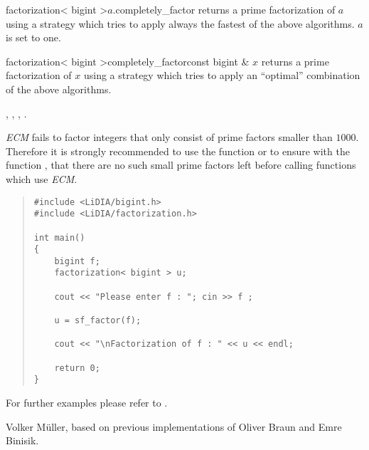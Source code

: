 \begin{cfcode}{factorization< bigint >}{$a$.completely_factor}{}
  returns a prime factorization of $a$ using a strategy which tries to apply always the fastest
  of the above algorithms.  $a$ is set to one.
\end{cfcode}

\begin{fcode}{factorization< bigint >}{completely_factor}{const bigint & $x$}
  returns a prime factorization of $x$ using a strategy which tries to apply an ``optimal''
  combination of the above algorithms.
\end{fcode}



\SEEALSO

, ,
,
.



\WARNINGS

\emph{ECM} fails to factor integers that only consist of prime factors smaller than $1000$.
Therefore it is strongly recommended to use the function  or to ensure with the
function , that there are no such small prime factors left before calling
functions which use \emph{ECM}.



\EXAMPLES

\begin{quote}
\begin{verbatim}
#include <LiDIA/bigint.h>
#include <LiDIA/factorization.h>

int main()
{
    bigint f;
    factorization< bigint > u;

    cout << "Please enter f : "; cin >> f ;

    u = sf_factor(f);

    cout << "\nFactorization of f : " << u << endl;

    return 0;
}
\end{verbatim}
\end{quote}

For further examples please refer to
.



\AUTHOR

Volker M\"uller, based on previous implementations of Oliver Braun and
Emre Binisik.
